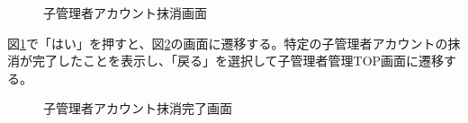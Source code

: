 \documentclass[a4j]{jarticle}
\begin{document}
\begin{figure}[H]
\centering
{}
\caption{子管理者アカウント抹消画面}
\label{fig:delete_admin}
\end{figure}
図\ref{fig:delete_admin}で「はい」を押すと、図\ref{fig:delete_admin_ok}の画面に遷移する。特定の子管理者アカウントの抹消が完了したことを表示し、「戻る」を選択して子管理者管理TOP画面に遷移する。
\begin{figure}[H]
\centering
{}
\caption{子管理者アカウント抹消完了画面}
\label{fig:delete_admin_ok}
\end{figure}
\end{document}
